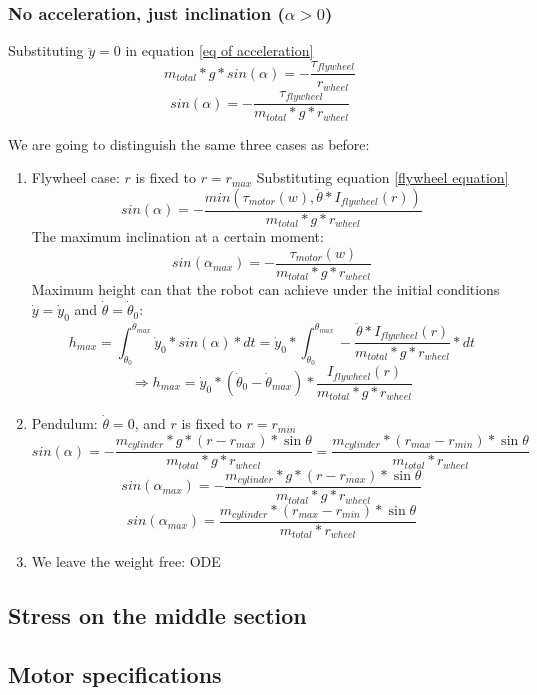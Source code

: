 \subsubsection{No acceleration, just inclination ($\alpha > 0$)}
Substituting $\ddot{y}=0$ in equation \ref{eq of acceleration}
\[m_{total} * g * sin(\alpha) = - \frac{\tau_{flywheel}}{r_{wheel}} \]
\[sin(\alpha) = - \frac{\tau_{flywheel}}{m_{total} * g * r_{wheel}} \]

We are going to distinguish the same three cases as before:
\begin{enumerate}
    \item Flywheel case: $r$ is fixed to $r = r_{max}$
    Substituting equation \ref{flywheel equation}
    \[sin(\alpha) = - \frac{min(\tau_{motor} (w), \ddot{\theta}*I_{flywheel}(r))}{m_{total} * g * r_{wheel}} \]
    The maximum inclination at a certain moment:
    \[sin(\alpha_{max}) = - \frac{\tau_{motor} (w)}{m_{total} * g * r_{wheel}} \]
    Maximum height can that the robot can achieve under the initial conditions $\dot{y}=\dot{y}_0$ and $\dot{\theta}=\dot{\theta}_0$:
    \[h_{max}=\int_{\dot{\theta}_0}^{\dot{\theta}_{max}} \dot{y}_0*sin(\alpha) * dt  = \dot{y}_0* \int_{\dot{\theta}_0}^{\dot{\theta}_{max}} - \frac{\ddot{\theta}*I_{flywheel}(r)}{m_{total} * g * r_{wheel}} * dt\]
    \[\boxed{\Rightarrow h_{max}= \dot{y}_0* (\dot{\theta}_0-\dot{\theta}_{max}) * \frac{I_{flywheel}(r)}{m_{total} * g * r_{wheel}}}\]

    \item Pendulum: $\dot{\theta} = 0$, and $r$ is fixed to $r = r_{min}$
    \[sin(\alpha) = - \frac{m_{cylinder} * g * (r - r_{max}) * \sin{\theta}}{m_{total} * g * r_{wheel}} = \frac{m_{cylinder} * (r_{max}- r_{min}) * \sin{\theta}}{m_{total} * r_{wheel}} \]
    \[sin(\alpha_{max}) = - \frac{m_{cylinder} * g * (r - r_{max}) * \sin{\theta}}{m_{total} * g * r_{wheel}}\]
    \[\boxed{sin(\alpha_{max}) = \frac{m_{cylinder} * (r_{max}- r_{min}) * \sin{\theta}}{m_{total} * r_{wheel}}} \]
    
    \item We leave the weight free:
    ODE

\end{enumerate}
\subsection{Stress on the middle section}



\subsection{Motor specifications}


